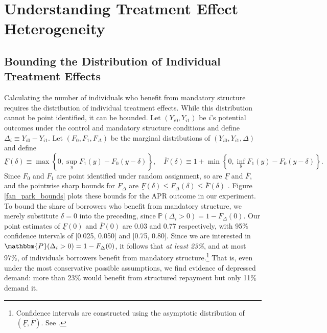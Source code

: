 \documentclass[12pt, a4paper, colorinlistoftodos]{article}
\begin{document}
\section{Understanding Treatment Effect Heterogeneity} \label{sec:RF}

\subsection{Bounding the Distribution of Individual Treatment Effects}
\label{sec:bounds}

Calculating the number of individuals who benefit from mandatory structure requires the distribution of individual treatment effects.
While this distribution cannot be point identified, it can be bounded.
Let $(Y_{i0}, Y_{i1})$ be $i$'s potential outcomes under the control and mandatory structure conditions and define $\Delta_i \equiv Y_{i0} - Y_{i1}$.
Let $(F_0, F_1, F_\Delta)$ be the marginal distributions of $(Y_{i0}, Y_{i1}, \Delta)$ and define 
\[
\underline{F}(\delta) \equiv \max \left\{0, \sup_y F_1(y) - F_0(y - \delta)  \right\}, \quad
\overline{F}(\delta) \equiv 1 + \min \left\{0, \inf_y F_1(y) - F_0(y-\delta) \right\}.
\]
Since $F_0$ and $F_1$ are point identified under random assignment, so are $\underline{F}$ and $\overline{F}$, and the pointwise sharp bounds for $F_\Delta$ are $\underline{F}(\delta) \leq F_\Delta(\delta) \leq \overline{F}(\delta)$ \citep{fan2010sharp}.
Figure \ref{fan_park_bounds} plots these bounds for the APR outcome in our experiment.  
To bound the share of borrowers who benefit from mandatory structure, we merely substitute $\delta=0$ into the preceding, since $\mathbb{P}(\Delta_i > 0) = 1 - F_\Delta(0)$.
Our point estimates of $\underline{F}(0)$ and $\overline{F}(0)$ are 0.03 and 0.77 respectively, with 95\% confidence intervals of [0.025, 0.050] and [0.75, 0.80]. Since we are interested in $\mathbbm{P}(\Delta_i >0) = 1 - F_\Delta(0)$, it follows that \textit{at least 23\%}, and at most 97\%, of individuals borrowers benefit from mandatory structure.\footnote{Confidence intervals are constructed using the asymptotic distribution of $(\underline{F}, \overline{F})$. See \cite{fan2010sharp}.} 
That is, even under the most conservative possible assumptions, we find evidence of depressed demand: more than 23\% would benefit from structured repayment but only 11\% demand it. 
\end{document}
